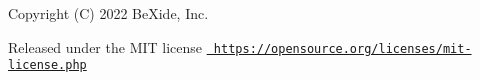 Copyright (C) 2022 Be\+Xide, Inc.


\begin{DoxyItemize}
\item Released under the MIT license \href{https://opensource.org/licenses/mit-license.php}{\texttt{ https\+://opensource.\+org/licenses/mit-\/license.\+php}} 
\end{DoxyItemize}